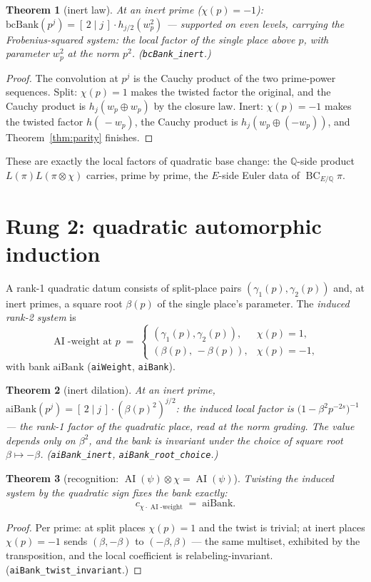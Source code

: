 \documentclass[11pt]{article}
\newtheorem{theorem}{Theorem}
\newcommand{\AI}{\operatorname{AI}}
\newcommand{\BC}{\operatorname{BC}}
\begin{document}
\begin{theorem}[inert law]\label{thm:inert}
At an inert prime ($\chi(p)=-1$): $\mathrm{bcBank}(p^j)=[\,2\mid j\,]\cdot h_{j/2}(w_p^2)$
— supported on even levels, carrying the Frobenius-squared system: the local factor of the
single place above $p$, with parameter $w_p^2$ at the norm $p^2$.
(\texttt{bcBank\_inert}.)
\end{theorem}
\begin{proof}
The convolution at $p^j$ is the Cauchy product of the two prime-power sequences.  Split:
$\chi(p)=1$ makes the twisted factor the original, and the Cauchy product is
$h_j(w_p\oplus w_p)$ by the closure law.  Inert: $\chi(p)=-1$ makes the twisted factor
$h(\,-w_p)$, the Cauchy product is $h_j(w_p\oplus(-w_p))$, and Theorem~\ref{thm:parity}
finishes.
\end{proof}

These are exactly the local factors of quadratic base change: the $\mathbb Q$-side product
$L(\pi)L(\pi\otimes\chi)$ carries, prime by prime, the $E$-side Euler data of
$\BC_{E/\mathbb Q}\pi$.

\section{Rung 2: quadratic automorphic induction}

A rank-1 quadratic datum consists of split-place pairs $(\gamma_1(p),\gamma_2(p))$ and, at
inert primes, a square root $\beta(p)$ of the single place's parameter.  The \emph{induced
rank-2 system} is
\[
  \AI\text{-weight at }p\;=\;\begin{cases}(\gamma_1(p),\gamma_2(p)), & \chi(p)=1,\\
  (\beta(p),\,-\beta(p)), & \chi(p)=-1,\end{cases}
\]
with bank $\mathrm{aiBank}$ (\texttt{aiWeight}, \texttt{aiBank}).

\begin{theorem}[inert dilation]\label{thm:aiinert}
At an inert prime, $\mathrm{aiBank}(p^j)=[\,2\mid j\,]\cdot(\beta(p)^2)^{j/2}$: the induced
local factor is $\bigl(1-\beta^2p^{-2s}\bigr)^{-1}$ — the rank-1 factor of the quadratic
place, read at the norm grading.  The value depends only on $\beta^2$, and the bank is
invariant under the choice of square root $\beta\mapsto-\beta$.
(\texttt{aiBank\_inert}, \texttt{aiBank\_root\_choice}.)
\end{theorem}

\begin{theorem}[recognition: $\AI(\psi)\otimes\chi=\AI(\psi)$]\label{thm:recog}
Twisting the induced system by the quadratic sign fixes the bank exactly:
\[
  c_{\chi\cdot\AI\text{-weight}}\;=\;\mathrm{aiBank}.
\]
\end{theorem}
\begin{proof}
Per prime: at split places $\chi(p)=1$ and the twist is trivial; at inert places
$\chi(p)=-1$ sends $(\beta,-\beta)$ to $(-\beta,\beta)$ — the same multiset, exhibited by
the transposition, and the local coefficient is relabeling-invariant.
(\texttt{aiBank\_twist\_invariant}.)
\end{proof}
\end{document}
